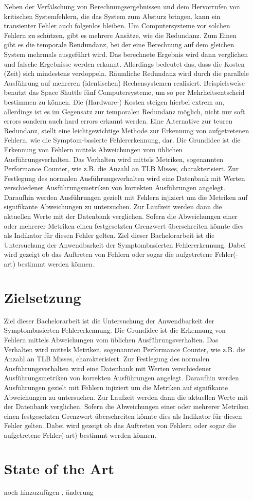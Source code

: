 Neben der Verfälschung von Berechnungsergebnissen und dem Hervorrufen von kritischen
Systemfehlern, die das System zum Absturz bringen, kann ein transienter Fehler auch folgenlos
bleiben. Um Computersysteme vor solchen Fehlern zu schützen, gibt es mehrere Ansätze, wie die
Redundanz.
Zum Einen gibt es die temporale Rendundanz, bei der eine Berechnung auf dem gleichen System
mehrmals ausgeführt wird. Das berechnete Ergebnis wird dann verglichen und falsche Ergebnisse
werden erkannt. Allerdings bedeutet das, dass die Kosten (Zeit) sich mindestens verdoppeln.
Räumliche Redundanz wird durch die parallele Ausführung auf mehreren (identischen)
Rechensystemen realisiert. Beispielsweise benutzt das Space Shuttle fünf Computersysteme, um
so per Mehrheitsentscheid bestimmen zu können. Die (Hardware-) Kosten steigen hierbei extrem
an, allerdings ist es im Gegensatz zur temporalen Redundanz möglich, nicht nur soft errors
sondern auch hard errors erkannt werden.
Eine Alternative zur teuren Redundanz, stellt eine leichtgewichtige Methode zur Erkennung von
aufgetretenen Fehlern, wie die Symptom-basierte Fehlererkennung, dar.
Die Grundidee ist die Erkennung von Fehlern mittels Abweichungen vom üblichen
Ausführungsverhalten. Das Verhalten wird mittels Metriken, sogenannten Performance Counter,
wie z.B. die Anzahl an TLB Misses, charakterisiert. Zur Festlegung des normalen
Ausführungsverhalten wird eine Datenbank mit Werten verschiedener Ausführungsmetriken von
korrekten Ausführungen angelegt.
Daraufhin werden Ausführungen gezielt mit Fehlern injiziert um die Metriken auf signifikante
Abweichungen zu untersuchen. Zur Laufzeit werden dann die aktuellen Werte mit der Datenbank
verglichen. Sofern die Abweichungen einer oder mehrerer Metriken einen festgesetzten Grenzwert
überschreiten könnte dies als Indikator für diesen Fehler gelten.
Ziel dieser Bachelorarbeit ist die Untersuchung der Anwendbarkeit der Symptombasierten
Fehlererkennung. Dabei wird gezeigt ob das Auftreten von Fehlern oder sogar die aufgetretene
Fehler(-art) bestimmt werden können.

\section{Zielsetzung}

Ziel dieser Bachelorarbeit ist die Untersuchung der Anwendbarkeit der Symptombasierten
Fehlererkennung.
Die Grundidee ist die Erkennung von Fehlern mittels Abweichungen vom üblichen
Ausführungsverhalten. Das Verhalten wird mittels Metriken, sogenannten Performance Counter,
wie z.B. die Anzahl an TLB Misses, charakterisiert. Zur Festlegung des normalen
Ausführungsverhalten wird eine Datenbank mit Werten verschiedener Ausführungsmetriken von
korrekten Ausführungen angelegt.
Daraufhin werden Ausführungen gezielt mit Fehlern injiziert um die Metriken auf signifikante
Abweichungen zu untersuchen. Zur Laufzeit werden dann die aktuellen Werte mit der Datenbank
verglichen. Sofern die Abweichungen einer oder mehrerer Metriken einen festgesetzten Grenzwert
überschreiten könnte dies als Indikator für diesen Fehler gelten.
Dabei wird gezeigt ob das Auftreten von Fehlern oder sogar die aufgetretene
Fehler(-art) bestimmt werden können.


\section{State of the Art}

noch hinzuzufügen , änderung
